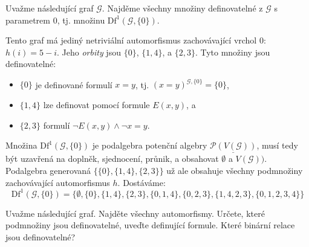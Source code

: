 \begin{example}
    Uvažme následující graf $\mathcal G$. Najděme všechny množiny definovatelné z $\mathcal G$ s parametrem $0$, tj. množinu 
    $\mathrm{Df}^1(\mathcal G,\{0\})$. 
    \begin{center}
        \end{center}
    Tento graf má jediný netriviální automorfismus zachovávající vrchol $0$: $h(i)=5-i$. Jeho \emph{orbity} jsou $\{0\}$, $\{1,4\}$, a $\{2,3\}$. Tyto množiny jsou definovatelné:
    \begin{itemize}
        \item $\{0\}$ je definované formulí $x=y$, tj. $(x=y)^{\mathcal G,\{0\}}=\{0\}$,
        \item $\{1,4\}$ lze definovat pomocí formule $E(x,y)$, a
        \item $\{2,3\}$ formulí $\neg E(x,y)\land \neg x=y$.
    \end{itemize}
    Množina $\mathrm{Df}^1(\mathcal G,\{0\})$ je podalgebra potenční algebry $\underline{\mathcal P(V(\mathcal G))}$, musí tedy být uzavřená na doplněk, sjednocení, průnik, a obsahovat $\emptyset$ a $V(\mathcal G))$. Podalgebra generovaná $\{\{0\},\{1,4\},\{2,3\}\}$ už ale obsahuje všechny podmnožiny zachovávající automorfismus $h$. Dostáváme:
    $$
    \mathrm{Df}^1(\mathcal G,\{0\})=\{\emptyset, \{0\}, \{1,4\}, \{2,3\}, \{0,1,4\}, \{0,2,3\}, \{1,4,2,3\}, \{0,1,2,3,4\}\}
    $$
\end{example}

\begin{exercise}
    Uvažme následující graf. Najděte všechny automorfismy. Určete, které podmnožiny jsou definovatelné, uveďte definující formule. Které binární relace jsou definovatelné?
    \begin{center}
    \end{center}
\end{exercise}


